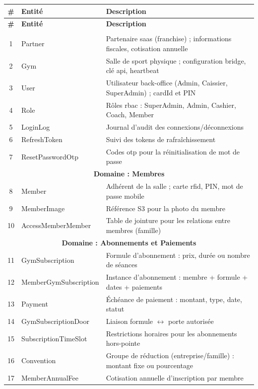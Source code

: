 \documentclass[../main.tex]{subfiles}
\begin{document}
\begin{longtable}{|c|>{\footnotesize}p{4.8cm}|p{7.5cm}|}
\hline
\textbf{\#} & \textbf{Entit\'{e}} & \textbf{Description} \\
\hline
\endfirsthead
\hline
\textbf{\#} & \textbf{Entit\'{e}} & \textbf{Description} \\
\hline
\endhead
\hline
\endfoot

\multicolumn{3}{|c|}{\textbf{Domaine : Noyau (Core)}} \\
\hline
1 & Partner & Partenaire \acrshort{saas} (franchise) ; informations fiscales, cotisation annuelle \\
\hline
2 & Gym & Salle de sport physique ; configuration bridge, cl\'{e} \acrshort{api}, heartbeat \\
\hline
3 & User & Utilisateur back-office (Admin, Caissier, SuperAdmin) ; cardId et PIN \\
\hline
4 & Role & R\^{o}les \acrshort{rbac} : SuperAdmin, Admin, Cashier, Coach, Member \\
\hline
5 & LoginLog & Journal d'audit des connexions/d\'{e}connexions \\
\hline
6 & RefreshToken & Suivi des tokens de rafra\^{i}chissement \\
\hline
7 & ResetPasswordOtp & Codes \acrshort{otp} pour la r\'{e}initialisation de mot de passe \\
\hline

\multicolumn{3}{|c|}{\textbf{Domaine : Membres}} \\
\hline
8 & Member & Adh\'{e}rent de la salle ; carte \acrshort{rfid}, PIN, mot de passe mobile \\
\hline
9 & MemberImage & R\'{e}f\'{e}rence S3 pour la photo du membre \\
\hline
10 & AccessMemberMember & Table de jointure pour les relations entre membres (famille) \\
\hline

\multicolumn{3}{|c|}{\textbf{Domaine : Abonnements et Paiements}} \\
\hline
11 & GymSubscription & Formule d'abonnement : prix, dur\'{e}e ou nombre de s\'{e}ances \\
\hline
12 & MemberGymSubscription & Instance d'abonnement : membre + formule + dates + paiements \\
\hline
13 & Payment & \'{E}ch\'{e}ance de paiement : montant, type, date, statut \\
\hline
14 & GymSubscriptionDoor & Liaison formule $\leftrightarrow$ porte autoris\'{e}e \\
\hline
15 & SubscriptionTimeSlot & Restrictions horaires pour les abonnements hors-pointe \\
\hline
16 & Convention & Groupe de r\'{e}duction (entreprise/famille) : montant fixe ou pourcentage \\
\hline
17 & MemberAnnualFee & Cotisation annuelle d'inscription par membre \\
\hline


\end{longtable}
\end{document}
